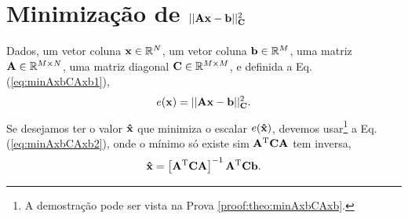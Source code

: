 \section{Minimização de $||\MATRIX{A}\VECTOR{x}-\VECTOR{b}||_{\MATRIX{C}}^2$
}



\begin{theorem}\label{theo:minAxbCAxb}
Dados,
um vetor coluna $\VECTOR{x}\in \mathbb{R}^N$, 
um vetor coluna $\VECTOR{b}\in \mathbb{R}^M$,  
uma matriz $\MATRIX{A} \in \mathbb{R}^{M\times N}$, 
uma matriz diagonal $\MATRIX{C} \in \mathbb{R}^{M\times M}$, e 
definida a Eq. (\ref{eq:minAxbCAxb1}),
\begin{equation}\label{eq:minAxbCAxb1}
e(\VECTOR{x})  = ||\MATRIX{A}\VECTOR{x}-\VECTOR{b}||_{\MATRIX{C}}^2.
\end{equation}
Se desejamos ter o valor $\VECTOR{\hat{x}}$ que minimiza o escalar $e(\VECTOR{\hat{x}})$,
devemos usar\footnote{A demostração pode ser vista na Prova \ref{proof:theo:minAxbCAxb}.} a Eq. (\ref{eq:minAxbCAxb2}),
onde o mínimo só existe sim $\MATRIX{A}^{\transpose}\MATRIX{C} \MATRIX{A}$ tem inversa,
\begin{equation}\label{eq:minAxbCAxb2}
\VECTOR{\hat{x}} =
\left[ \MATRIX{A}^{\transpose}\MATRIX{C} \MATRIX{A} \right]^{-1}\MATRIX{A}^{\transpose}\MATRIX{C}\VECTOR{b}.
\end{equation}

\end{theorem}


